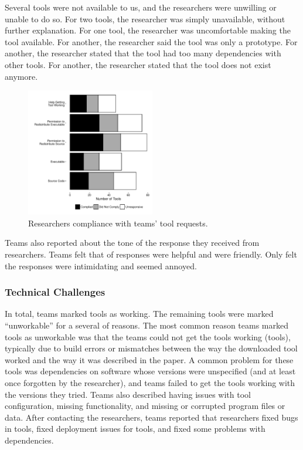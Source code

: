 \documentclass[10pt,conference]{IEEEtran}
\begin{document}
Several tools were not available to us, 
and the researchers were unwilling or unable to do so.
For two tools, the researcher was simply unavailable,
without further explanation.
For one tool, the researcher was uncomfortable making 
the tool available.
For another, the researcher said the tool was only a prototype.
For another, the researcher stated that the tool had too
many dependencies with other tools.
For another, the researcher stated that the tool does not
exist anymore.

\begin{figure}[!t]
  \centering
    \includegraphics[width=0.5\textwidth]{requestPlot.pdf}
  \caption{Researchers compliance with teams' tool requests.}\label{fig:requests}
\end{figure}


Teams also reported about the tone of the response they received from 
researchers.
Teams felt that \emailsHelpful of responses were helpful and
\emailsFriendly were friendly.
Only \emailsIntimidating felt the responses were intimidating
and \emailsAnnoyed seemed annoyed.                                                                                                              


\subsubsection{Technical Challenges}

In total, teams marked \working tools as working.
The remaining tools were marked ``unworkable'' for a 
several of reasons.
The most common reason teams marked tools as unworkable
was that the teams could not get the tools 
working (\unworkCouldntWorkIt tools),
typically due to build errors or mismatches between
the way the downloaded tool worked and the way 
it was described in the paper.
A common problem for these tools was dependencies on
software whose versions were unspecified 
(and at least once forgotten by the researcher), and teams
failed to get the tools working with the versions they
tried.
Teams also described having issues with 
tool configuration,
missing functionality, and
missing or corrupted program files or data.
After contacting the researchers, teams reported that researchers 
fixed bugs in \contactFixBug tools,
fixed deployment issues for \contactFixDepl tools,
and fixed some problems with dependencies.
\end{document}
